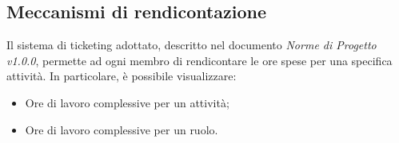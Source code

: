 \subsection{Meccanismi di rendicontazione}
Il sistema di ticketing adottato, descritto nel documento \emph{Norme di Progetto v1.0.0}, permette ad ogni membro di rendicontare le ore spese per una specifica attività. In particolare, è possibile visualizzare:
\begin{itemize}
\item{Ore di lavoro complessive per un attività;}
\item{Ore di lavoro complessive per un ruolo.}
\end{itemize}
\pagebreak